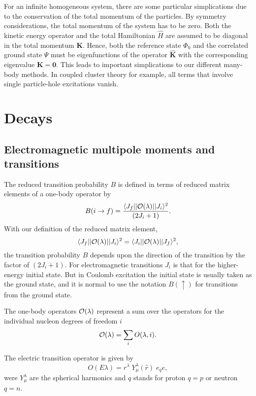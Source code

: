 \documentclass[graybox,sectrefs,envcountresetchap,open=right]{svmonodo}
\begin{document}
For an infinite homogeneous system, there are some particular
simplications due to the conservation of the total momentum of the
particles.  By symmetry considerations, the total momentum of the
system has to be zero. Both the kinetic energy operator and the
total Hamiltonian $\hat{H}$ are assumed to be diagonal in the total
momentum $\mathbf{K}$. Hence, both the reference state $\Phi_{0}$ and
the correlated ground state $\Psi$ must be eigenfunctions of the
operator $\mathbf{\hat{K}}$ with the corresponding eigenvalue
$\mathbf{K} = \mathbf{0}$.  This leads to important
simplications to our different many-body methods. In coupled cluster
theory for example, all
terms that involve single particle-hole excitations vanish. 











\chapter{Decays}
\label{ch:decay}

\section{Electromagnetic multipole moments and transitions}
The reduced
transition probability $B$ is defined in terms of reduced matrix
elements of a one-body operator by
\[
B(i \rightarrow f)= \frac{\langle J_{f}||{\cal O}(\lambda )||J_{i}\rangle^{2}}{(2J_{i}+1)}. 
\]
With our definition of the reduced matrix element,
\[
\langle J_{f}||{\cal O}(\lambda )||J_{i}\rangle^{2} =\langle J_{i}||{\cal O}(\lambda )||J_{f}\rangle^{2},  
\]
the transition probability $B$ depends upon the direction of the transition by the factor
of $(2J_{i}+1)$. For electromagnetic
transitions $J_{i}$ is that for the higher-energy initial state. But in
Coulomb excitation the initial state is usually
taken as the ground state, and it is normal to use the notation $B(\uparrow)$ for transitions from the ground state.

The one-body operators $  {\cal O}(\lambda )  $ represent a sum over
the operators for the individual nucleon degrees of freedom  $  i  $
\[
{\cal O}(\lambda ) = \sum_{i} O(\lambda ,i). 
\]

The electric transition operator is given by
\[
O(E\lambda ) = r^{\lambda } \; Y^{\lambda }_{\mu }(\hat{r}) \; e_{q} e, 
\]
were $Y^{\lambda }_{\mu }$ are the spherical harmonics
and $q$ stands for proton $q=p$ or neutron $q=n$.
\end{document}

